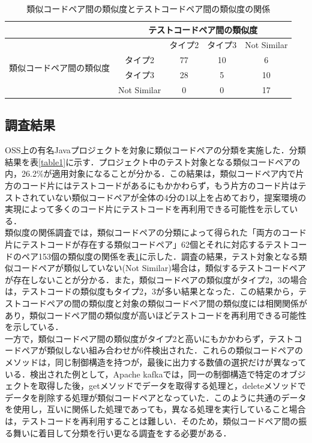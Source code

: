\documentclass{fose2019}           %
\begin{document}
\begin{table}[]
\centering
\caption{類似コードペア間の類似度とテストコードペア間の類似度の関係}
\label{table2}
\begin{tabular}{|c|c|c|c|c|}
\hline
                             & \multicolumn{4}{c|}{\scriptsize テストコードペア間の類似度}         \\ \hline
\multirow{4}{*}{\scriptsize 類似コードペア間の類似度} &             & \scriptsize タイプ2 & \scriptsize タイプ3 & \scriptsize Not Similar \\ \cline{2-5} 
                             & \scriptsize タイプ2 & \scriptsize 77          & \scriptsize 10     & \scriptsize 6     \\ \cline{2-5} 
                             &\scriptsize タイプ3       & \scriptsize 28           & \scriptsize 5    & \scriptsize 10    \\ \cline{2-5} 
                             & \scriptsize Not Similar       & \scriptsize 0           & \scriptsize 0    & \scriptsize 17     \\ \hline
\end{tabular}
\end{table}


\subsection{調査結果}
OSS上の有名Javaプロジェクトを対象に類似コードペアの分類を実施した．分類結果を表\ref{table1}に示す．プロジェクト中のテスト対象となる類似コードペアの内，26.2\%が適用対象になることが分かる．この結果は，類似コードペア内で片方のコード片にはテストコードがあるにもかかわらず，もう片方のコード片はテストされていない類似コードペアが全体の4分の1以上を占めており，提案環境の実現によって多くのコード片にテストコードを再利用できる可能性を示している．
\\\indent 類似度の関係調査では，類似コードペアの分類によって得られた「両方のコード片にテストコードが存在する類似コードペア」62個とそれに対応するテストコードのペア153個の類似度の関係を表\ref{table2}に示した．調査の結果，テスト対象となる類似コードペアが類似していない(Not Similar)場合は，類似するテストコードペアが存在しないことが分かる．また，類似コードペアの類似度がタイプ2，3の場合は，テストコードの類似度もタイプ2，3が多い結果となった．この結果から，テストコードペアの間の類似度と対象の類似コードペア間の類似度には相関関係があり，類似コードペア間の類似度が高いほどテストコードを再利用できる可能性を示している．
\\\indent 一方で，類似コードペア間の類似度がタイプ2と高いにもかかわらず，テストコードペアが類似しない組み合わせが6件検出された．これらの類似コードペアのメソッドは，同じ制御構造を持つが，最後に出力する数値の選択だけが異なっている．検出された例として，Apache kafkaでは，同一の制御構造で特定のオブジェクトを取得した後，getメソッドでデータを取得する処理と，deleteメソッドでデータを削除する処理が類似コードペアとなっていた．このように共通のデータを使用し，互いに関係した処理であっても，異なる処理を実行していること場合は，テストコードを再利用することは難しい．そのため，類似コードペア間の振る舞いに着目して分類を行い更なる調査をする必要がある．
\end{document}
